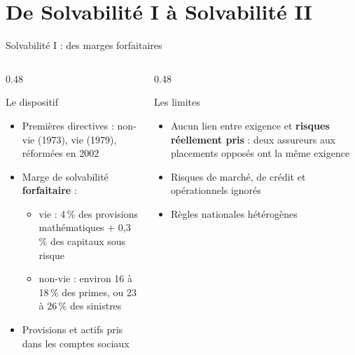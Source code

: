 \documentclass[10pt,aspectratio=169]{beamer}
\begin{document}
\section{De Solvabilité I à Solvabilité II}

\begin{frame}{Solvabilité I : des marges forfaitaires}
\begin{columns}[T]
\begin{column}{0.48\textwidth}
\begin{block}{Le dispositif}
\begin{itemize}
  \item Premières directives : non-vie (1973), vie (1979), réformées en 2002
  \item Marge de solvabilité \textbf{forfaitaire} :
  \begin{itemize}
    \item vie : 4\,\% des provisions mathématiques $+$ 0,3\,\% des capitaux sous risque
    \item non-vie : environ 16 à 18\,\% des primes, ou 23 à 26\,\% des sinistres
  \end{itemize}
  \item Provisions et actifs pris dans les comptes sociaux
\end{itemize}
\end{block}
\end{column}
\begin{column}{0.48\textwidth}
\begin{alertblock}{Les limites}
\begin{itemize}
  \item Aucun lien entre exigence et \textbf{risques réellement pris} : deux assureurs aux
        placements opposés ont la même exigence
  \item Risques de marché, de crédit et opérationnels ignorés
  \item Règles nationales hétérogènes
\end{itemize}
\end{alertblock}
\end{column}
\end{columns}
\end{frame}
\end{document}
